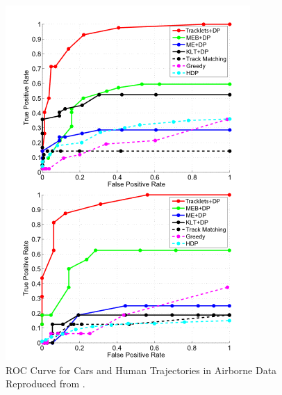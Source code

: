 \begin{figure}[hbt!]
  \centering
  \includegraphics[width=.6\textwidth]{image/lit/roc.PNG}
  \caption[ROC Curve for Cars and Human Trajectories in Airborne Data]
  {ROC Curve for Cars and Human Trajectories in Airborne Data Reproduced
  from .}
 \label{fig:rocresult}
\end{figure}
